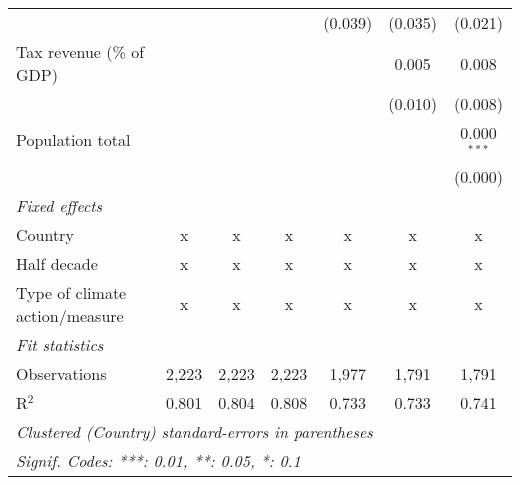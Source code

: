 \begin{tabular}{lcccccc}
                                                 &         &               &                & (0.039)        & (0.035)        & (0.021)\\   
   Tax revenue (\% of GDP)                       &         &               &                &                & 0.005          & 0.008\\   
                                                 &         &               &                &                & (0.010)        & (0.008)\\   
   Population total                              &         &               &                &                &                & 0.000$^{***}$\\   
                                                 &         &               &                &                &                & (0.000)\\   
   \emph{Fixed effects}\\
   Country                                       & x       & x             & x              & x              & x              & x\\  
   Half decade                                   & x       & x             & x              & x              & x              & x\\  
   Type of climate action/measure                & x       & x             & x              & x              & x              & x\\  
   \midrule \emph{Fit statistics}\\
   Observations                                  & 2,223   & 2,223         & 2,223          & 1,977          & 1,791          & 1,791\\  
   R$^2$                                         & 0.801   & 0.804         & 0.808          & 0.733          & 0.733          & 0.741\\  
   \midrule
   \multicolumn{7}{l}{\emph{Clustered (Country) standard-errors in parentheses}}\\
   \multicolumn{7}{l}{\emph{Signif. Codes: ***: 0.01, **: 0.05, *: 0.1}}\\
\end{tabular}
\par\endgroup


